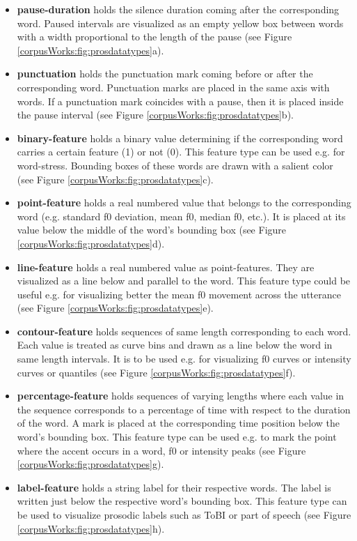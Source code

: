 \begin{itemize}
\item \textbf{pause-duration} holds the silence duration coming after the corresponding word. Paused intervals are visualized as an empty yellow box between words with a width proportional to the length of the pause (see Figure \ref{corpusWorks:fig:prosdatatypes}a).
\item \textbf{punctuation} holds the punctuation mark coming before or after the corresponding word. Punctuation marks are placed in the same axis with words. If a punctuation mark coincides with a pause, then it is placed inside the pause interval (see Figure \ref{corpusWorks:fig:prosdatatypes}b).
\item \textbf{binary-feature} holds a binary value determining if the corresponding word carries a certain feature (1) or not (0). This feature type can be used e.g. for word-stress. Bounding boxes of these words are drawn with a salient color (see Figure \ref{corpusWorks:fig:prosdatatypes}c).
\item \textbf{point-feature} holds a real numbered value that belongs to the corresponding word (e.g. standard f0 deviation, mean f0, median f0, etc.). It is placed at its value below the middle of the word's bounding box (see Figure \ref{corpusWorks:fig:prosdatatypes}d).
\item \textbf{line-feature} holds a real numbered value as point-features. They are visualized as a line below and parallel to the word. This feature type could be useful e.g. for visualizing better the mean f0 movement across the utterance (see Figure \ref{corpusWorks:fig:prosdatatypes}e).
\item \textbf{contour-feature} holds sequences of same length corresponding to each word. Each value is treated as curve bins and drawn as a line below the word in same length intervals. It is to be used e.g. for visualizing f0 curves or intensity curves or quantiles (see Figure \ref{corpusWorks:fig:prosdatatypes}f).
\item \textbf{percentage-feature} holds sequences of varying lengths where each value in the sequence corresponds to a percentage of time with respect to the duration of the word. A mark is placed at the corresponding time position below the word's bounding box. This feature type can be used e.g. to mark the point where the accent occurs in a word, f0 or intensity peaks (see Figure \ref{corpusWorks:fig:prosdatatypes}g).
\item \textbf{label-feature} holds a string label for their respective words. The label is written just below the respective word's bounding box. This feature type can be used to visualize prosodic labels such as ToBI or part of speech (see Figure \ref{corpusWorks:fig:prosdatatypes}h). 
\end{itemize}

